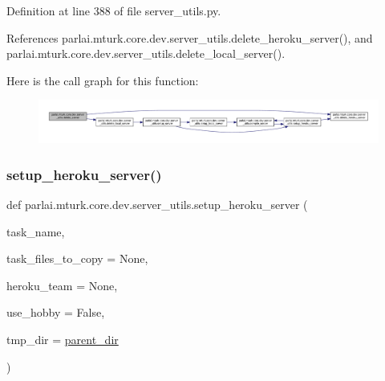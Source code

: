 Definition at line 388 of file server\+\_\+utils.\+py.



References parlai.\+mturk.\+core.\+dev.\+server\+\_\+utils.\+delete\+\_\+heroku\+\_\+server(), and parlai.\+mturk.\+core.\+dev.\+server\+\_\+utils.\+delete\+\_\+local\+\_\+server().

Here is the call graph for this function\+:
\nopagebreak
\begin{figure}[H]
\begin{center}
\leavevmode
\includegraphics[width=350pt]{namespaceparlai_1_1mturk_1_1core_1_1dev_1_1server__utils_a3e5b4105c54a289108a8a240aa9b9043_cgraph}
\end{center}
\end{figure}
\mbox{\label{namespaceparlai_1_1mturk_1_1core_1_1dev_1_1server__utils_a138743e96f495bce1535782ffa0f38bf}} 
\subsubsection{\texorpdfstring{setup\+\_\+heroku\+\_\+server()}{setup\_heroku\_server()}}
{\footnotesize\ttfamily def parlai.\+mturk.\+core.\+dev.\+server\+\_\+utils.\+setup\+\_\+heroku\+\_\+server (\begin{DoxyParamCaption}\item[{}]{task\+\_\+name,  }\item[{}]{task\+\_\+files\+\_\+to\+\_\+copy = {\ttfamily None},  }\item[{}]{heroku\+\_\+team = {\ttfamily None},  }\item[{}]{use\+\_\+hobby = {\ttfamily False},  }\item[{}]{tmp\+\_\+dir = {\ttfamily \hyperlink{namespaceparlai_1_1mturk_1_1core_1_1dev_1_1server__utils_a432ae14c0d872fbfebe4d9b7d73d13b9}{parent\+\_\+dir}} }\end{DoxyParamCaption})}




